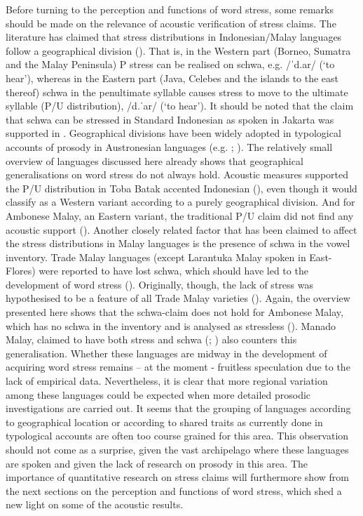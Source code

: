 Before turning to the perception and functions of word stress, some remarks should be made on the relevance of acoustic verification of stress claims. The literature has claimed that stress distributions in Indonesian/Malay languages follow a geographical division (\citealt{prentice_manado_1994}). That is, in the Western part (Borneo, Sumatra and the Malay Peninsula) P stress can be realised on schwa, e.g. /ˈd.ar/ (`to hear'), whereas in the Eastern part (Java, Celebes and the islands to the east thereof) schwa in the penultimate syllable causes stress to move to the ultimate syllable (P/U distribution), /d.ˈar/ (`to hear'). It should be noted that the claim that schwa can be stressed in Standard Indonesian as spoken in Jakarta was supported in \citet{laksman_location_1994}. Geographical divisions have been widely adopted in typological accounts of prosody in Austronesian languages (e.g. \citealt{goedemans_no_2014}; \citealt{kaufman_suprasegmental_2024}). The relatively small overview of languages discussed here already shows that geographical generalisations on word stress do not always hold. Acoustic measures supported the P/U distribution in Toba Batak accented Indonesian (\citealt{goedemans_stress_2007}), even though it would classify as a Western variant according to a purely geographical division. And for Ambonese Malay, an Eastern variant, the traditional P/U claim did not find any acoustic support (\citealt{maskikit-essed_no_2016}). Another closely related factor that has been claimed to affect the stress distributions in Malay languages is the presence of schwa in the vowel inventory. Trade Malay languages (except Larantuka Malay spoken in East-Flores) were reported to have lost schwa, which should have led to the development of word stress (\citealt{paauw_malay_2009}). Originally, though, the lack of stress was hypothesised to be a feature of all Trade Malay varieties (\citealt{goedemans_no_2014}). Again, the overview presented here shows that the schwa-claim does not hold for Ambonese Malay, which has no schwa in the inventory and is analysed as stressless (\citealt{maskikit-essed_no_2016}). Manado Malay, claimed to have both stress and schwa (\citealt{stoel_focus_2005}; \citealt{stoel_intonation_2007}) also counters this generalisation. Whether these languages are midway in the development of acquiring word stress remains – at the moment - fruitless speculation due to the lack of empirical data. Nevertheless, it is clear that more regional variation among these languages could be expected when more detailed prosodic investigations are carried out. It seems that the grouping of languages according to geographical location or according to shared traits as currently done in typological accounts are often too course grained for this area. This observation should not come as a surprise, given the vast archipelago where these languages are spoken and given the lack of research on prosody in this area. The importance of quantitative research on stress claims will furthermore show from the next sections on the perception and functions of word stress, which shed a new light on some of the acoustic results.

